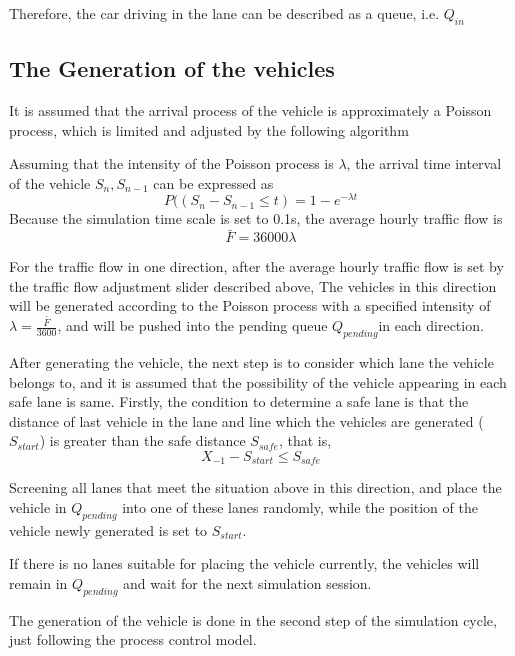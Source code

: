 \documentclass[a4paper]{paper}
\begin{document}
Therefore, the car driving in the lane can be described as a queue, i.e. $Q_{in}$

\subsection{The Generation of the vehicles}
It is assumed that the arrival process of the vehicle is approximately a Poisson process, which is limited and adjusted by the following algorithm

Assuming that the intensity of the Poisson process is $\lambda$, the arrival time interval of the vehicle $S_n,S_{n-1}$ can be expressed as 
$$P((S_n-S_{n-1}\le t) = 1 - e^{-\lambda t}$$
Because the simulation time scale is set to 0.1s, the average hourly traffic flow is $$\bar{F}=36000\lambda$$

For the traffic flow in one direction, after the average hourly traffic flow is set by the traffic flow adjustment slider described above, The vehicles in this direction will be generated according to the Poisson process with a specified intensity of $\lambda=\displaystyle{\frac{\bar{F}}{3600}}$, and will be pushed into the pending queue $Q_{pending}$in each direction.

After generating the vehicle, the next step is to consider which lane the vehicle belongs to, and it is assumed that the possibility of the vehicle appearing in each safe lane is same. Firstly, the condition to determine a safe lane is that the distance of last vehicle in the lane and line which the vehicles are generated ($S_{start}$) is greater than the safe distance $S_{safe}$, that is,
$$X_{-1}-S_{start}\le S_{safe}$$

Screening all lanes that meet the situation above in this direction, and place the vehicle in $Q_{pending}$ into one of these lanes randomly, while the position of the vehicle newly generated is set to $S_{start}$.

If there is no lanes suitable for placing the vehicle currently, the vehicles will remain in $Q_{pending}$ and wait for the next simulation session.

The generation of the vehicle is done in the second step of the simulation cycle, just following the process control model.
\end{document}
